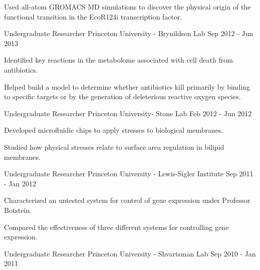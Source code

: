 \begin{cventries}
{\begin{cvitems}
        \item Used all-atom GROMACS MD simulations to discover the physical origin of the functional transition in the EcoR124i transcription factor.
      \end{cvitems}
    }
\ifoutdated
  \cventry
    {Undergraduate Researcher} %
    {Princeton University - Brynildsen Lab} %
    {} %
    {Sep 2012 - Jun 2013} %
    {
      \begin{cvitems} %
        \item Identified key reactions in the \ecoli metabolome associated with cell death from antibiotics.
        \item Helped build a model to determine whether antibiotics kill primarily by binding to specific targets or by the generation of deleterious reactive oxygen species.
      \end{cvitems}
    }
  \cventry
    {Undergraduate Researcher} %
    {Princeton University- Stone Lab} %
    {} %
    {Feb 2012 - Jun 2012} %
    {
      \begin{cvitems} %
        \item Developed microfluidic chips to apply stresses to biological membranes.
        \item Studied how physical stresses relate to surface area regulation in bilipid membranes.
      \end{cvitems}
    }
  \cventry
    {Undergraduate Researcher} %
    {Princeton University - Lewis-Sigler Institute} %
    {} %
    {Sep 2011 - Jan 2012} %
    {
      \begin{cvitems} %
        \item Characterized an untested system for control of gene expression under Professor Botstein.
        \item Compared the effectiveness of three different systems for controlling gene expression.
      \end{cvitems}
    }
  \cventry
    {Undergraduate Researcher} %
    {Princeton University - Shvartsman Lab} %
    {} %
    {Sep 2010 - Jan 2011} %

\end{cventries}
